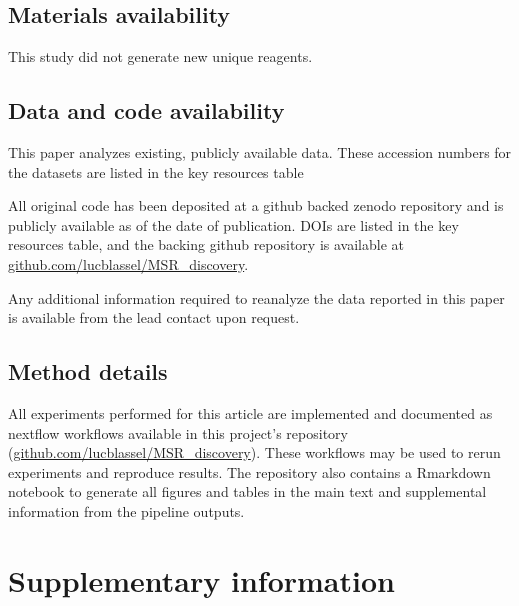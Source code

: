 \documentclass[
  11pt,
  twoside]{scrbook}
\begin{document}
\hypertarget{materials-availability}{%
\subsection*{Materials availability}\label{materials-availability}}

This study did not generate new unique reagents.

\hypertarget{data-and-code-availability}{%
\subsection*{Data and code availability}\label{data-and-code-availability}}

This paper analyzes existing, publicly available data. These accession numbers for the datasets are listed in the key resources table

All original code has been deposited at a github backed zenodo repository and is publicly available as of the date of publication. DOIs are listed in the key resources table, and the backing github repository is available at \href{https://github.com/lucblassel/MSR_discovery}{github.com/lucblassel/MSR\_discovery}.

Any additional information required to reanalyze the data reported in this paper is available from the lead contact upon request.

\hypertarget{method-details}{%
\subsection*{Method details}\label{method-details}}

All experiments performed for this article are implemented and documented as nextflow workflows available in this project's repository (\href{https://github.com/lucblassel/MSR_discovery}{github.com/lucblassel/MSR\_discovery}). These workflows may be used to rerun experiments and reproduce results. The repository also contains a Rmarkdown notebook to generate all figures and tables in the main text and supplemental information from the pipeline outputs.

\hypertarget{supplementary-information}{%
\section*{Supplementary information}\label{supplementary-information}}
\end{document}
